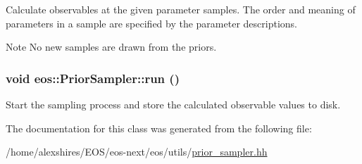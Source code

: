 \label{classeos_1_1PriorSampler_a610cb408ecf74f29d8632c3b5b264c91}
Calculate observables at the given parameter samples. The order and meaning of parameters in a sample are specified by the parameter descriptions. \begin{DoxyNote}{Note}
No new samples are drawn from the priors. 
\end{DoxyNote}
\hypertarget{classeos_1_1PriorSampler_a62210b9eb8835714166f9ce2689685e3}{
\subsubsection[{run}]{\setlength{\rightskip}{0pt plus 5cm}void eos::PriorSampler::run ()}}
\label{classeos_1_1PriorSampler_a62210b9eb8835714166f9ce2689685e3}
Start the sampling process and store the calculated observable values to disk. 

The documentation for this class was generated from the following file:\begin{DoxyCompactItemize}
\item 
/home/alexshires/EOS/eos-\/next/eos/utils/\hyperlink{prior__sampler_8hh}{prior\_\-sampler.hh}\end{DoxyCompactItemize}
